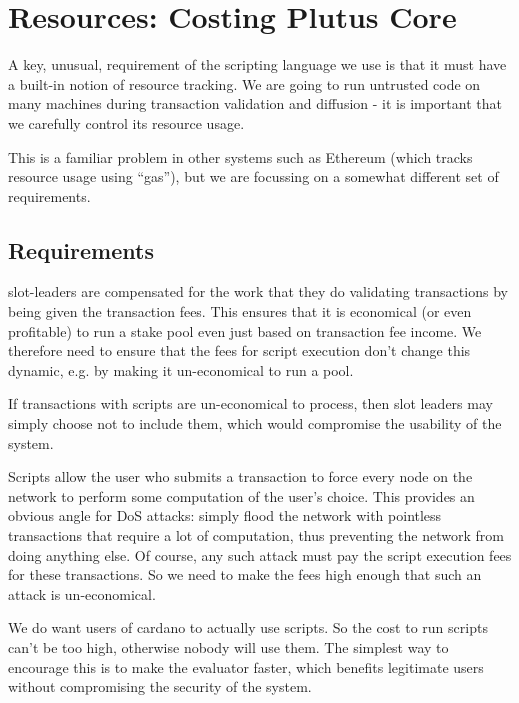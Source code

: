 \section{Resources: Costing Plutus Core}
\label{sec:costing}

A key, unusual, requirement of the scripting language we use is that it must have a built-in notion of resource tracking.
We are going to run untrusted code on many machines during transaction validation and diffusion - it is important that we carefully control its resource usage.

This is a familiar problem in other systems such as Ethereum (which tracks resource usage using ``gas''), but we are focussing on a somewhat different set of requirements.

\subsection{Requirements}
\begin{requirement}
\label{req:costing-profitability}
\Glspl{slot-leader} are compensated for the work that they do validating transactions by being given the transaction fees.
This ensures that it is economical (or even profitable) to run a stake pool even just based on transaction fee income.
We therefore need to ensure that the fees for script execution don't change this dynamic, e.g. by making it un-economical to run a pool.

If transactions with scripts are un-economical to process, then slot leaders may simply choose not to include them, which would compromise the usability of the system.
\end{requirement}

\begin{requirement}
\label{req:costing-dos}
Scripts allow the user who submits a transaction to force every node on the network to perform some computation of the user's choice.
This provides an obvious angle for DoS attacks: simply flood the network with pointless transactions that require a lot of computation, thus preventing the network from doing anything else.
Of course, any such attack must pay the script execution fees for these transactions.
So we need to make the fees high enough that such an attack is un-economical.
\end{requirement}

\begin{requirement}
\label{req:costing-usable}
We do want users of \gls{cardano} to actually use scripts.
So the cost to run scripts can't be too high, otherwise nobody will use them.
The simplest way to encourage this is to make the evaluator faster, which benefits legitimate users without compromising the security of the system.
\end{requirement}

